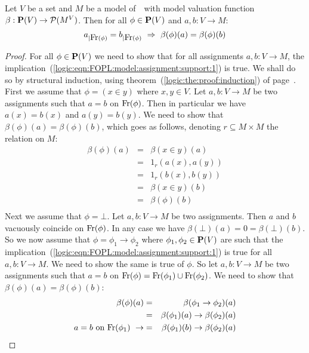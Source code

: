 \begin{prop}\label{logic:prop:FOPL:model:assignment:support}
Let $V$ be a set and $M$ be a model of\, \pv\ with model valuation
function $\beta:\mbox{${\bf P}(V)$}\to{\cal P}(M^{V})$. Then for all $\phi\in\mbox{${\bf P}(V)$}$
and $a,b:V\to M$:
    \begin{equation}\label{logic:eqn:FOPL:model:assignment:support:1}
    a_{|\mbox{\rm Fr}(\phi)}=b_{|\mbox{\rm Fr}(\phi)}\ \Rightarrow\
    \beta(\phi)(a)=\beta(\phi)(b)
    \end{equation}
\end{prop}
\begin{proof}
For all $\phi\in\mbox{${\bf P}(V)$}$ we need to show that for all assignments
$a,b:V\to M$, the
implication~(\ref{logic:eqn:FOPL:model:assignment:support:1}) is
true. We shall do so by structural induction, using
theorem~(\ref{logic:the:proof:induction}) of
page~\pageref{logic:the:proof:induction}. First we assume that
$\phi=(x\in y)$ where $x,y\in V$. Let $a,b:V\to M$ be two
assignments such that $a=b$ on $\mbox{\rm Fr}(\phi)$. Then in particular we
have $a(x)=b(x)$ and $a(y)=b(y)$. We need to show that
$\beta(\phi)(a)=\beta(\phi)(b)$, which goes as follows, denoting
$r\subseteq M\times M$ the relation on $M$:
    \begin{eqnarray*}
    \beta(\phi)(a)&=&\beta(x\in y)(a)\\
    &=&1_{r}(a(x),a(y))\\
    &=&1_{r}(b(x),b(y))\\
    &=&\beta(x\in y)(b)\\
    &=&\beta(\phi)(b)\\
    \end{eqnarray*}
Next we assume that $\phi=\bot$. Let $a,b:V\to M$ be two
assignments. Then $a$ and $b$ vacuously coincide on $\mbox{\rm Fr}(\phi)$.
In any case we have $\beta(\bot)(a)=0=\beta(\bot)(b)$. So we now
assume that $\phi=\phi_{1}\to\phi_{2}$ where
$\phi_{1},\phi_{2}\in\mbox{${\bf P}(V)$}$ are such that the
implication~(\ref{logic:eqn:FOPL:model:assignment:support:1}) is
true for all $a,b:V\to M$. We need to show the same is true of
$\phi$. So let $a,b:V\to M$ be two assignments such that $a=b$ on
$\mbox{\rm Fr}(\phi)=\mbox{\rm Fr}(\phi_{1})\cup\mbox{\rm Fr}(\phi_{2})$. We need to show
that $\beta(\phi)(a)=\beta(\phi)(b)$:
    \begin{eqnarray*}
    \beta(\phi)(a)&=&\beta(\phi_{1}\to\phi_{2})(a)\\
    &=&\beta(\phi_{1})(a)\to\beta(\phi_{2})(a)\\
    a=b\mbox{\ on\ }\free(\phi_{1})\ \rightarrow
    &=&\beta(\phi_{1})(b)\to\beta(\phi_{2})(a)\\

\end{eqnarray*}
\end{proof}

